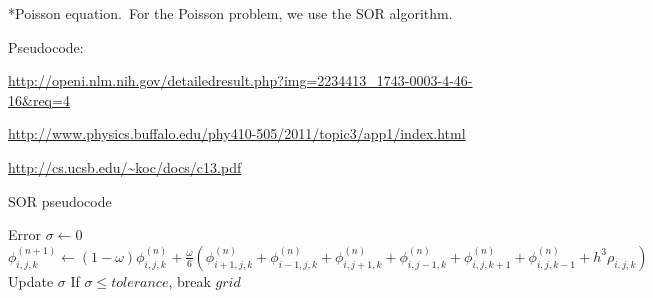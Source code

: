 \documentclass[titlepage, 11pt]{article}
\makeatletter
\renewcommand{\subsubsection}{\@startsection
        {subsubsection}
        {2}
        {0mm}
        {.5\baselineskip}
        {0mm}
        {\it\bfseries\normalsize}}
\makeatother
\begin{document}
\subsubsection*{Poisson equation.}\ For the Poisson problem, we use the SOR algorithm.

Pseudocode: 

\url{http://openi.nlm.nih.gov/detailedresult.php?img=2234413_1743-0003-4-46-16&req=4}

\url{http://www.physics.buffalo.edu/phy410-505/2011/topic3/app1/index.html}

\url{http://cs.ucsb.edu/~koc/docs/c13.pdf}

\begin{algorithm}
 \label{pseudo:SOR}
 \caption{SOR pseudocode}
\begin{algorithmic}[1]
   \State Error $\sigma \gets 0$
    \State $\phi_{i,j,k}^{(n+1)} \gets (1-\omega)\phi_{i,j,k}^{(n)} + \frac{\omega}{6} (\phi_{i+1,j,k}^{(n)} + \phi_{i-1,j,k}^{(n)} + \phi_{i,j+1,k}^{(n)} + \phi_{i,j-1,k}^{(n)} + \phi_{i,j,k+1}^{(n)} + \phi_{i,j,k-1}^{(n)} + h^3\rho_{i,j,k})$
    \State Update $\sigma$
   \EndFor
   \State If $\sigma \leq tolerance$, break
  \EndFor
  \State \Return $grid$
 \EndFunction
\end{algorithmic}
\end{algorithm}
\end{document}
